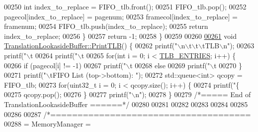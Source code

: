 \begin{DoxyCode}
{{{{{{{{{{{{{{{{{00250         \textcolor{keywordtype}{int} index\_to\_replace = FIFO\_tlb.front();
00251         FIFO\_tlb.pop();
00252         pagecol[index\_to\_replace] = pagenum;
00253         framecol[index\_to\_replace] = framenum;
00254         FIFO\_tlb.push(index\_to\_replace);
00255         \textcolor{keywordflow}{return} index\_to\_replace;
00256     \}
00257     \textcolor{keywordflow}{return} -1;
00258 \}
00259 
00260 
\hypertarget{memory_8cpp_source.tex_l00261}{}\hyperlink{classTranslationLookasideBuffer_a1f92817ce0487d710c6ef5b0176dd358}{00261} \textcolor{keywordtype}{void} \hyperlink{classTranslationLookasideBuffer_a1f92817ce0487d710c6ef5b0176dd358}{TranslationLookasideBuffer::PrintTLB}() \{
00262     printf(\textcolor{stringliteral}{"\(\backslash\)n\(\backslash\)t\(\backslash\)t\(\backslash\)tTLB\(\backslash\)n"});
00263     printf(\textcolor{stringliteral}{"\(\backslash\)t%
00264     printf(\textcolor{stringliteral}{"\(\backslash\)t%
00265     \textcolor{keywordflow}{for}(\textcolor{keywordtype}{int} i = 0; i < \hyperlink{memory_8h_a49009cc208379999b117ed68da61c759}{TLB\_ENTRIES}; i++) \{
00266         \textcolor{keywordflow}{if} (pagecol[i] != -1)
00267              printf(\textcolor{stringliteral}{"\(\backslash\)t%
00268         \textcolor{keywordflow}{else}
00269             printf(\textcolor{stringliteral}{"\(\backslash\)t%
00270     \}
00271     printf(\textcolor{stringliteral}{"\(\backslash\)tFIFO List (top->bottom): "});
00272     std::queue<int> qcopy = FIFO\_tlb;
00273     \textcolor{keywordflow}{for}(uint32\_t i = 0; i < qcopy.size(); i++) \{
00274         printf(\textcolor{stringliteral}{"\{%
00275         qcopy.pop();
00276     \}
00277     printf(\textcolor{stringliteral}{"\(\backslash\)n"});
00278 \}
00279 \textcolor{comment}{/*=====  End of TranslationLookasideBuffer  ======*/}
00280 
00281 
00282 
00283 
00284 
00285 
00286 
00287 \textcolor{comment}{/*=====================================}
00288 \textcolor{comment}{=            MemoryManager            =}
}}}}}}}}}}}}}}}}}}}}}}
\end{DoxyCode}
